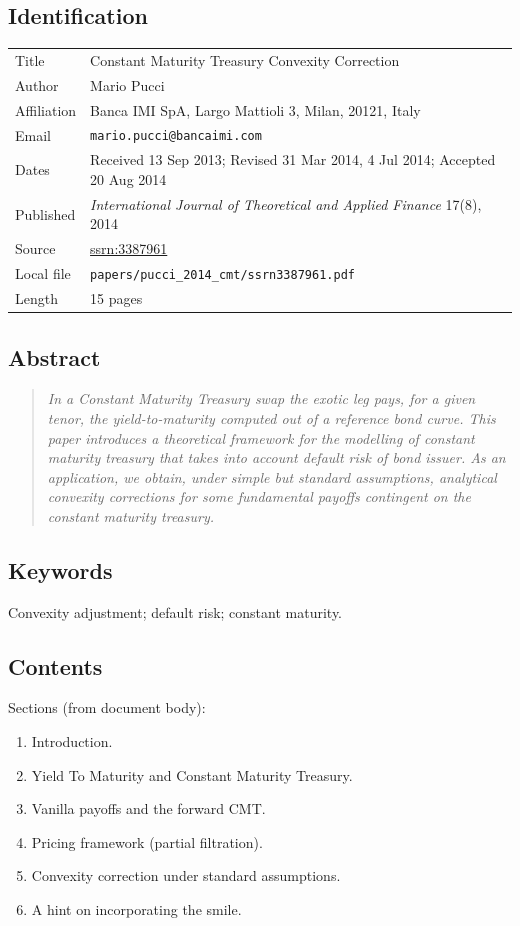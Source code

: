\documentclass[11pt,a4paper]{article}
\begin{document}
\subsection*{Identification}
\begin{tabular}{@{}p{3.5cm}p{11cm}@{}}
\toprule
Title           & Constant Maturity Treasury Convexity Correction \\
Author          & Mario Pucci \\
Affiliation     & Banca IMI SpA, Largo Mattioli 3, Milan, 20121, Italy \\
Email           & \texttt{mario.pucci@bancaimi.com} \\
Dates           & Received 13 Sep 2013; Revised 31 Mar 2014, 4 Jul 2014; Accepted 20 Aug 2014 \\
Published       & \emph{International Journal of Theoretical and Applied Finance} 17(8), 2014 \\
Source          & \href{https://ssrn.com/abstract=3387961}{ssrn:3387961} \\
Local file      & \texttt{papers/pucci\_2014\_cmt/ssrn3387961.pdf} \\
Length          & 15 pages \\
\bottomrule
\end{tabular}

\subsection*{Abstract}
\begin{quote}\itshape
In a Constant Maturity Treasury swap the exotic leg pays, for a given
tenor, the yield-to-maturity computed out of a reference bond curve.
This paper introduces a theoretical framework for the modelling of
constant maturity treasury that takes into account default risk of
bond issuer. As an application, we obtain, under simple but standard
assumptions, analytical convexity corrections for some fundamental
payoffs contingent on the constant maturity treasury.
\end{quote}

\subsection*{Keywords}
Convexity adjustment; default risk; constant maturity.

\subsection*{Contents}
Sections (from document body):
\begin{enumerate}[noitemsep]
  \item Introduction.
  \item Yield To Maturity and Constant Maturity Treasury.
  \item Vanilla payoffs and the forward CMT.
  \item Pricing framework (partial filtration).
  \item Convexity correction under standard assumptions.
  \item A hint on incorporating the smile.
\end{enumerate}
\end{document}
